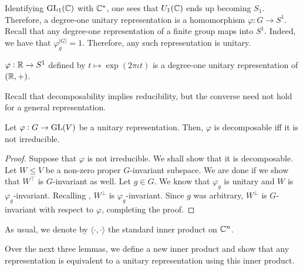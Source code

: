			Identifying $\operatorname{GL}_1(\mathbb{C})$ with $\mathbb{C}^*$, one sees that $U_1(\mathbb{C})$ ends up becoming $S_1$. Therefore, a degree-one unitary representation is a homomorphism $\varphi : G \to S^1$.\\
			Recall that any degree-one representation of a finite group maps into $S^1$. Indeed, we have that $\varphi_g^{|G|} = 1$. Therefore, any such representation is unitary.

			\begin{fex}
				$\varphi : \mathbb{R} \to S^1$ defined by $t \mapsto \exp(2\pi\iota t)$ is a degree-one unitary representation of $(\mathbb{R},+)$.
			\end{fex}

			Recall that decomposability implies reducibility, but the converse need not hold for a general representation.

			\begin{flem}
				\label{lem: unitary decomp iff irred}
				Let $\varphi : G \to \operatorname{GL}(V)$ be a unitary representation. Then, $\varphi$ is decomposable iff it is not irreducible.
			\end{flem}
			\begin{proof}
				Suppose that $\varphi$ is not irreducible. We shall show that it is decomposable. Let $W \le V$ be a non-zero proper $G$-invariant subspace. We are done if we show that $W^\top$ is $G$-invariant as well. Let $g \in G$. We know that $\varphi_g$ is unitary and $W$ is $\varphi_g$-invariant. Recalling , $W^\perp$ is $\varphi_g$-invariant. Since $g$ was arbitrary, $W^\perp$ is $G$-invariant with respect to $\varphi$, completing the proof.
			\end{proof}

			As usual, we denote by $\langle \cdot,\cdot\rangle$ the standard inner product on $\mathbb{C}^n$.

			Over the next three lemmas, we define a new inner product and show that any representation is equivalent to a unitary representation using this inner product.

